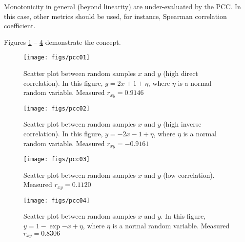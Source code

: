 Monotonicity in general (beyond linearity) are under-evaluated by the PCC. In this case, other metrics should be used, for instance, Spearman correlation coefficient. 

Figures \ref{fig:pcc01} -- \ref{fig:pcc04} demonstrate the concept.
\begin{figure}
	\texttt{[image: figs/pcc01]}
	\caption{Scatter plot between random samples $x$ and $y$ (high direct correlation). In this figure, $y = 2x+1+\eta$, where $\eta$ is a normal random variable. Measured $r_{xy}=0.9146$}
	\label{fig:pcc01}
\end{figure}

\begin{figure}
	\texttt{[image: figs/pcc02]}
	\caption{Scatter plot between random samples $x$ and $y$ (high inverse correlation). In this figure, $y = -2x-1+\eta$, where $\eta$ is a normal random variable. Measured $r_{xy}=-0.9161$}
	\label{fig:pcc02}
\end{figure}

\begin{figure}
	\texttt{[image: figs/pcc03]}
	\caption{Scatter plot between random samples $x$ and $y$ (low correlation). Measured $r_{xy}=0.1120$}
	\label{fig:pcc03}
\end{figure}

\begin{figure}
	\texttt{[image: figs/pcc04]}
	\caption{Scatter plot between random samples $x$ and $y$. In this figure, $y = 1-\exp{-x}+\eta$, where $\eta$ is a normal random variable. Measured $r_{xy}=0.8306$}
	\label{fig:pcc04}
\end{figure}
%
%
